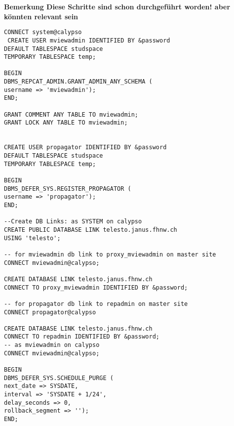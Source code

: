 \documentclass[a4paper,10pt,titlepage=false]{scrreprt}
\begin{document}
\textbf{Bemerkung
Diese Schritte sind schon durchgeführt worden! aber könnten relevant sein}


\begin{lstlisting}[caption=Setup Materilized View Site (Updateable),style=sql]
CONNECT system@calypso
 CREATE USER mviewadmin IDENTIFIED BY &password
DEFAULT TABLESPACE studspace
TEMPORARY TABLESPACE temp;

BEGIN
DBMS_REPCAT_ADMIN.GRANT_ADMIN_ANY_SCHEMA (
username => 'mviewadmin');
END;

GRANT COMMENT ANY TABLE TO mviewadmin;
GRANT LOCK ANY TABLE TO mviewadmin;


CREATE USER propagator IDENTIFIED BY &password
DEFAULT TABLESPACE studspace
TEMPORARY TABLESPACE temp;

BEGIN
DBMS_DEFER_SYS.REGISTER_PROPAGATOR (
username => 'propagator');
END;

--Create DB Links: as SYSTEM on calypso
CREATE PUBLIC DATABASE LINK telesto.janus.fhnw.ch
USING 'telesto';

-- for mviewadmin db link to proxy_mviewadmin on master site
CONNECT mviewadmin@calypso;

CREATE DATABASE LINK telesto.janus.fhnw.ch
CONNECT TO proxy_mviewadmin IDENTIFIED BY &password;

-- for propagator db link to repadmin on master site
CONNECT propagator@calypso

CREATE DATABASE LINK telesto.janus.fhnw.ch
CONNECT TO repadmin IDENTIFIED BY &password;
-- as mviewadmin on calypso
CONNECT mviewadmin@calypso;

BEGIN
DBMS_DEFER_SYS.SCHEDULE_PURGE (
next_date => SYSDATE,
interval => 'SYSDATE + 1/24',
delay_seconds => 0,
rollback_segment => '');
END;  
\end{lstlisting}
\end{document}
